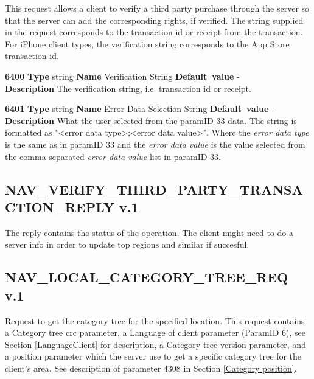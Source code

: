 \documentclass[a4paper]{article}
\begin{document}
This request allows a client to verify a third party purchase through the
server so that the server can add the corresponding rights, if verified.
The string supplied in the request corresponds to the transaction id or 
receipt from the transaction. For iPhone client types, the verification string
corresponds to the App Store transaction id.

\begin{list}{\textbf{ParamID}}{}
\item \textbf{6400} \textbf{Type} string \textbf{Name} Verification String
                 \textbf{Default~value} - \\
  \textbf{Description} The verification string, i.e. transaction id or receipt.
\item \textbf{6401} \textbf{Type} string \textbf{Name} Error Data Selection String
                 \textbf{Default~value} - \\
  \textbf{Description} What the user selected from the paramID 33 data.
  The string is formatted as "<error data type>;<error data value>". Where
  the \emph{error data type} is the same as in paramID 33 and
  the \emph{error data value} is the value selected from the comma separated
  \emph{error data value} list in paramID 33.
\end{list}

\subsection{NAV\_VERIFY\_THIRD\_PARTY\_TRANSACTION\_REPLY v.1}

The reply contains the status of the operation. The client might need to
do a server info in order to update top regions and similar if succesful.

\subsection{NAV\_LOCAL\_CATEGORY\_TREE\_REQ v.1}

Request to get the category tree for the specified location. This request 
contains a Category tree crc parameter, a Language of client parameter 
(ParamID 6), see Section \ref{LanguageClient} for description, 
a Category tree version parameter, and a position parameter which the
server use to get a specific category tree for the client's area. See 
description of parameter 4308 in Section \ref{Category position}.
\end{document}
